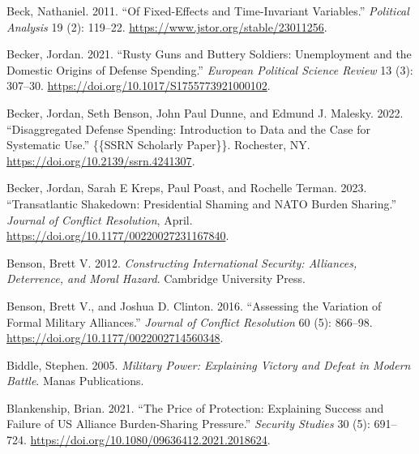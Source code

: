 \documentclass[
  12,
  letterpaper,
  DIV=11,
  numbers=noendperiod]{scrartcl}
\newlength{\cslhangindent}
\newlength{\cslentryspacingunit} %
\newenvironment{CSLReferences}[2] %
 {%
  \setlength{\parindent}{0pt}
  \ifodd #1
  \let\oldpar\par
  \def\par{\hangindent=\cslhangindent\oldpar}
  \fi
  \setlength{\parskip}{#2\cslentryspacingunit}
 }%
 {}
\begin{document}
\begin{CSLReferences}{1}{0}
\leavevmode{}%
Beck, Nathaniel. 2011. {``Of {Fixed-Effects} and {Time-Invariant
Variables}.''} \emph{Political Analysis} 19 (2): 119--22.
\url{https://www.jstor.org/stable/23011256}.

\leavevmode{}%
Becker, Jordan. 2021. {``Rusty Guns and Buttery Soldiers: Unemployment
and the Domestic Origins of Defense Spending.''} \emph{European
Political Science Review} 13 (3): 307--30.
\url{https://doi.org/10.1017/S1755773921000102}.

\leavevmode{}%
Becker, Jordan, Seth Benson, John Paul Dunne, and Edmund J. Malesky.
2022. {``Disaggregated {Defense Spending}: {Introduction} to {Data} and
the {Case} for {Systematic Use}.''} \{\{SSRN Scholarly Paper\}\}.
{Rochester, NY}. \url{https://doi.org/10.2139/ssrn.4241307}.

\leavevmode{}%
Becker, Jordan, Sarah E Kreps, Paul Poast, and Rochelle Terman. 2023.
{``Transatlantic {Shakedown}: {Presidential Shaming} and {NATO Burden
Sharing}.''} \emph{Journal of Conflict Resolution}, April.
\url{https://doi.org/10.1177/00220027231167840}.

\leavevmode{}%
Benson, Brett V. 2012. \emph{Constructing {International Security}:
{Alliances}, {Deterrence}, and {Moral Hazard}}. {Cambridge University
Press}.

\leavevmode{}%
Benson, Brett V., and Joshua D. Clinton. 2016. {``Assessing the
{Variation} of {Formal Military Alliances}.''} \emph{Journal of Conflict
Resolution} 60 (5): 866--98.
\url{https://doi.org/10.1177/0022002714560348}.

\leavevmode{}%
Biddle, Stephen. 2005. \emph{Military {Power}: {Explaining Victory} and
{Defeat} in {Modern Battle}}. {Manas Publications}.

\leavevmode{}%
Blankenship, Brian. 2021. {``The {Price} of {Protection}: {Explaining
Success} and {Failure} of {US Alliance Burden-Sharing Pressure}.''}
\emph{Security Studies} 30 (5): 691--724.
\url{https://doi.org/10.1080/09636412.2021.2018624}.


\end{CSLReferences}
\end{document}
